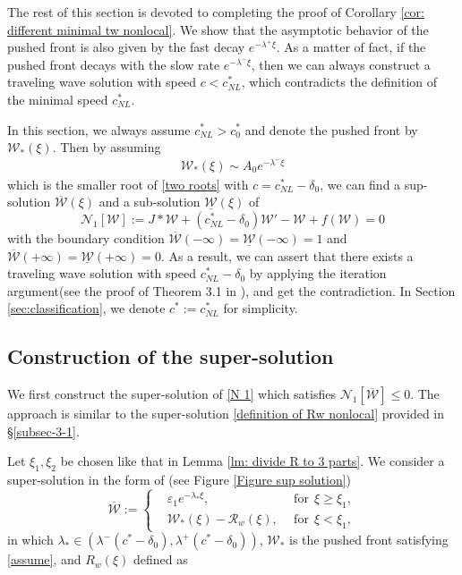 \documentclass[11pt,a4paper]{article}
\numberwithin{equation}{section}
\numberwithin{figure}{section}
\newcommand\bea{\begin{eqnarray}}
\newcommand\eea{\end{eqnarray}}
\begin{document}
The rest of this section is devoted to completing the proof of Corollary \ref{cor: different minimal tw nonlocal}. We show that the asymptotic behavior of the pushed front is also given by the fast decay $e^{-\lambda^+\xi}$. As a matter of fact, if the pushed front decays with the slow rate $e^{-\lambda^-\xi}$, then we can always construct a traveling wave solution with speed $c<c^*_{NL}$, which contradicts the definition of the minimal speed $c^*_{NL}$. 

In this section, we always assume $c^*_{NL}>c^*_0$ and denote the pushed front by $\mathcal{W}_*(\xi)$.
Then by assuming 
\bea\label{assume}
\mathcal{W}_*(\xi)\sim A_0e^{-\lambda^-\xi}
\eea
which is the smaller root of \eqref{two roots} with $c=c^*_{NL}-\delta_0$,
we can find a sup-solution $\overline{\mathcal{W}}(\xi)$ and a sub-solution $\underline{\mathcal{W}}(\xi)$ of
\begin{equation}\label{N 1}
\mathcal N_1[\mathcal W]:=J\ast \mathcal W+(c^*_{NL}-\delta_0)\mathcal W'-\mathcal W+f(\mathcal W)=0
\end{equation}
with the boundary condition $\overline{\mathcal{W}}(-\infty)=\underline{\mathcal{W}}(-\infty)=1$ and $\overline{\mathcal{W}}(+\infty)=\underline{\mathcal{W}}(+\infty)=0$.
As a result, we can assert that there exists a traveling wave solution with speed $c^*_{NL}-\delta_0$ by applying the iteration argument(see the proof of Theorem 3.1 in \cite{Coville Dupaigne}),  and get the contradiction. In Section \ref{sec:classification}, we denote $c^*:=c^*_{NL}$ for simplicity.


\subsection{Construction of the super-solution}
We first construct the super-solution of \eqref{N 1} which satisfies $\mathcal N_1[\overline{\mathcal W}]\le 0$. The approach is similar to the super-solution \eqref{definition of Rw nonlocal} provided in \S \ref{subsec-3-1}. 

Let $\xi_1,\xi_2$ be chosen like that in Lemma \ref{lm: divide R to 3 parts}. 
We consider a super-solution in the form of (see Figure \ref{Figure sup solution})
\begin{equation*}
\overline{\mathcal W}:=\left\{
\begin{aligned}
&\varepsilon_1e^{-\lambda_*\xi},&\ \ \text{for}\ \ \xi\ge \xi_1,\\
&\mathcal{W}_*(\xi)-\mathcal{R}_w(\xi),&\ \ \text{for}\ \ \xi< \xi_1,
\end{aligned}
\right.
\end{equation*}
in which $\lambda_*\in(\lambda^-(c^*-\delta_0),\lambda^+(c^*-\delta_0))$, $\mathcal{W}_*$ is the pushed front satisfying \eqref{assume},  and $R_w(\xi)$ defined as
\end{document}
